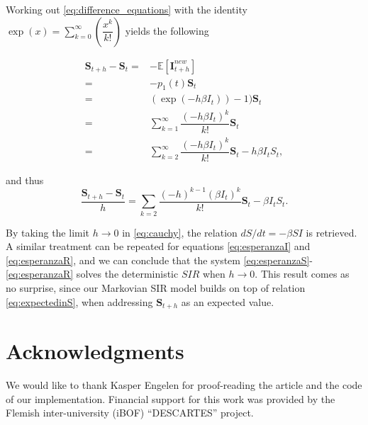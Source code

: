 \documentclass[a4paper,preprint]{elsarticle}
\renewcommand{\vec}[1]{\boldsymbol{#1}}
\begin{document}
Working out \eqref{eq:difference_equations} with the identity $\exp(x)=\sum_{k=0}^{\infty}\left(\dfrac{x^k}{k!}\right)$ yields the following

\begin{equation*}
    \begin{split}
    \vec{S}_{t+h}-\vec{S}_{t} = {} & -\mathbb{E}[\vec{I}_{t+h}^{new}]\\
    ={}&-p_1(t)\vec{S}_{t}\\
    ={}&(\exp(-h\beta I_t))-1)\vec{S}_{t}\\
    ={}&\sum_{k=1}^{\infty}\dfrac{(-h\beta I_t)^k}{k!}\vec{S}_{t}\\
    ={}&\sum_{k=2}^{\infty}\dfrac{(-h\beta I_t)^k}{k!}\vec{S}_{t}-h\beta I_t S_t,
    \end{split}\end{equation*}

and thus
\begin{equation}
\label{eq:cauchy}
\dfrac{\vec{S}_{t+h}-\vec{S}_{t}}{h}=\sum_{k=2}\dfrac{(-h)^{k-1}(\beta I_t)^{k}}{k!}\vec{S}_{t}-\beta I_t S_t.
\end{equation}

By taking the limit $h\rightarrow{0}$ in \eqref{eq:cauchy}, the relation $dS/dt =  -\beta SI$ is retrieved. A similar treatment can be repeated for equations \eqref{eq:esperanzaI} and \eqref{eq:esperanzaR}, and we can conclude that the system \eqref{eq:esperanzaS}-\eqref{eq:esperanzaR} solves the deterministic $SIR$ when $h\rightarrow{0}$. This result comes as no surprise, since our Markovian SIR model builds on top of relation \eqref{eq:expectedinS}, when addressing $\vec{S}_{t+h}$ as an expected value.

\section*{Acknowledgments}
We would like to thank Kasper Engelen for proof-reading the article and the code of our implementation.
Financial support for this work was provided by the Flemish inter-university (iBOF) ``DESCARTES'' project.





\end{document}
